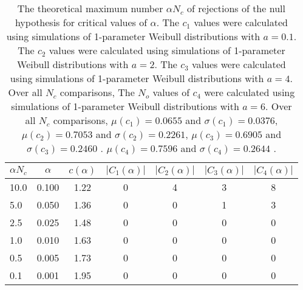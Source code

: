 \begin{table}[h!]
\begin{center}
\begin{tabular}{| l | c | c | c | c | c | c |}\hline
$\alpha N_c$ & $\alpha$ & $c(\alpha)$ & $|C_1(\alpha)|$ & $|C_2(\alpha)|$ & $|C_3(\alpha)|$ & $|C_4(\alpha)|$ \\\hline\hline
10.0 & 0.100 & 1.22 & 0 & 4 & 3 & 8 \\\hline
5.0 & 0.050 & 1.36 & 0 & 0 & 1 & 3 \\\hline
2.5 & 0.025 & 1.48 & 0 & 0 & 0 & 0 \\\hline
1.0 & 0.010 & 1.63 & 0 & 0 & 0 & 0 \\\hline
0.5 & 0.005 & 1.73 & 0 & 0 & 0 & 0 \\\hline
0.1 & 0.001 & 1.95 & 0 & 0 & 0 & 0 \\\hline
\end{tabular}
\caption{The theoretical maximum number $\alpha N_c$ of rejections
of the null hypothesis for critical values of $\alpha$.
The $c_1$ values were calculated using simulations of 1-parameter Weibull distributions with $a=0.1$.
The $c_2$ values were calculated using simulations of 1-parameter Weibull distributions with $a=2$.
The $c_3$ values were calculated using simulations of 1-parameter Weibull distributions with $a=4$.
Over all $N_c$ comparisons,
The $N_o$ values of $c_4$ were calculated using simulations of
 1-parameter Weibull distributions with $a=6$.
Over all $N_c$ comparisons,
 $\mu(c_1)=0.0655$ and $\sigma(c_1)=0.0376$,
 $\mu(c_2)=0.7053$ and $\sigma(c_2)=0.2261$,
 $\mu(c_3)=0.6905$ and $\sigma(c_3)=0.2460$ .
 $\mu(c_4)=0.7596$ and $\sigma(c_4)=0.2644$ .
}
\end{center}
\end{table}